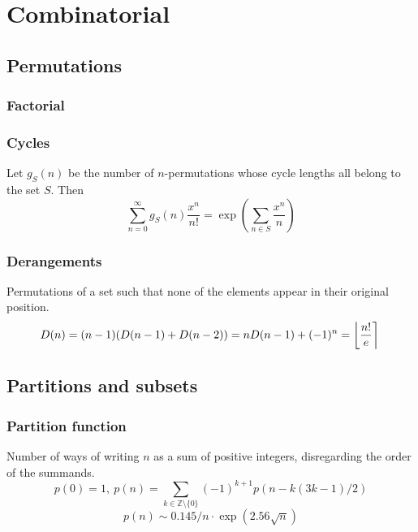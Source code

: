 \chapter{Combinatorial}

\section{Permutations}
	\subsection{Factorial}
		

	\subsection{Cycles}
		Let $g_S(n)$ be the number of $n$-permutations whose cycle lengths all belong to the set $S$. Then
		$$\sum_{n=0} ^\infty g_S(n) \frac{x^n}{n!} = \exp\left(\sum_{n\in S} \frac{x^n} {n} \right)$$

	\subsection{Derangements}
		Permutations of a set such that none of the elements appear in their original position.
		\[ \mkern-2mu D(n) = (n-1)(D(n-1)+D(n-2)) = n D(n-1)+(-1)^n = \left\lfloor\frac{n!}{e}\right\rceil \]



\section{Partitions and subsets}
	\subsection{Partition function}
		Number of ways of writing $n$ as a sum of positive integers, disregarding the order of the summands.
		\[ p(0) = 1,\ p(n) = \sum_{k \in \mathbb Z \setminus \{0\}}{(-1)^{k+1} p(n - k(3k-1) / 2)} \]
		\[ p(n) \sim 0.145 / n \cdot \exp(2.56 \sqrt{n}) \]

